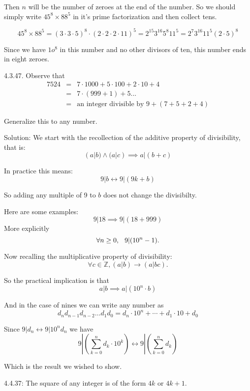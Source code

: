 \documentclass[16 pt]{amsart}
\theoremstyle{definition}
\theoremstyle{remark}
\numberwithin{equation}{subsection}
\newcommand{\Z}{\mathbb{Z}}
\begin{document}
Then $n$ will be the number of zeroes at the end of the number.  So we should simply write $45^8 \times 88^5$ in it's prime factorization and then collect tens.

\[
45^8 \times 88^5 = (3\cdot 3\cdot 5)^8 \cdot (2\cdot 2\cdot 2\cdot 11)^5 = 2^{15}3^{16}5^8 11^5 = 2^{7}3^{16}11^5 (2\cdot 5)^8
\]

Since we have $1o^8$ in this number and no other divisors of ten, this number ends in eight zeroes.


\newpage

4.3.47. Observe that 
\begin{eqnarray*}
7524 &=& 7 \cdot 1000 + 5\cdot 100 + 2\cdot 10 + 4\\
        &=& 7\cdot(999+1) + 5 ...\\
&=& \text{an integer divisible by } 9 + (7+5+2+4)
\end{eqnarray*}

Generalize this to any number.

\vspace{1in}

Solution: We start with the recollection of the additive property of divisibility, that is:
\[
(a|b) \wedge (a|c) \implies a|(b+c)
\]


In practice this means:
\[
9 | b  \leftrightarrow 9 | (9k + b)
\]

So adding any multiple of 9 to $b$ does not change the divisibilty.

Here are some examples:
\[
9 | 18  \implies 9 | (18+999)
\]
More explicitly
\[
\forall n\geq 0, \hspace{.1in} 9 | (10^n -1).
\]

Now recalling the multiplicative property of divisibility:
\[
\forall c\in\Z, (a|b) \rightarrow (a|bc).
\]

So the practical implication is that
\[
a | b  \implies a|(10^n\cdot b)
\]

And in the case of nines we can write any number as
\[
d_nd_{n-1}d_{n-2}\dots d_1d_0 = d_n\cdot 10^n + \cdots + d_1\cdot 10 + d_0
\]

Since $9|d_n \leftrightarrow 9|10^n d_n$ we have
\[
9|(\sum_{k=0}^{n} d_k\cdot 10^k) \longleftrightarrow 9| (\sum_{k=0}^{n} d_k)
\]

Which is the result we wished to show.


\newpage

4.4.37: The square of any integer is of the form $4k$ or $4k+1.$


\vspace{1in}
\end{document}
